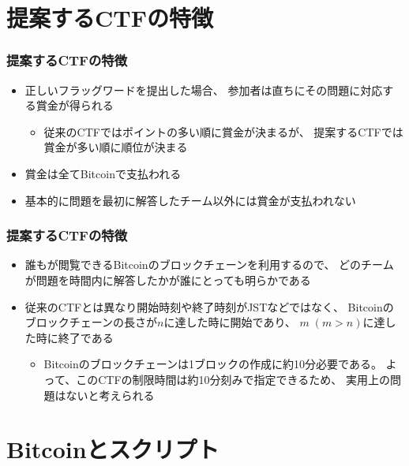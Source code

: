 \section{提案するCTFの特徴}

\begin{frame}
  \frametitle{提案するCTFの特徴}

  \pause
  \begin{itemize}
    \item<+-> 正しいフラッグワードを提出した場合、
    参加者は直ちにその問題に対応する賞金が得られる
    \begin{itemize}
      \item<+-> 従来のCTFではポイントの多い順に賞金が決まるが、
      提案するCTFでは賞金が多い順に順位が決まる
    \end{itemize}

    \item<+-> 賞金は全てBitcoinで支払われる

    \item<+-> 基本的に問題を最初に解答したチーム以外には賞金が支払われない
  \end{itemize}
\end{frame}

\begin{frame}
  \frametitle{提案するCTFの特徴}

  \begin{itemize}
    \item<+-> 誰もが閲覧できるBitcoinのブロックチェーンを利用するので、
    どのチームが問題を時間内に解答したかが誰にとっても明らかである

    \item<+-> 従来のCTFとは異なり開始時刻や終了時刻がJSTなどではなく、
    Bitcoinのブロックチェーンの長さが$n$に達した時に開始であり、
    $m\;(m > n)$に達した時に終了である
    \begin{itemize}
      \item Bitcoinのブロックチェーンは1ブロックの作成に約10分必要である。
      よって、このCTFの制限時間は約10分刻みで指定できるため、
      実用上の問題はないと考えられる
    \end{itemize}
  \end{itemize}
\end{frame}

\section{Bitcoinとスクリプト}

